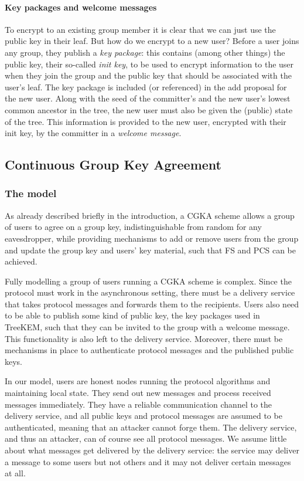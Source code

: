\paragraph{Key packages and welcome messages} To encrypt to an existing group member it is clear that we can just use the public key in their leaf. But how do we encrypt to a new user? Before a user joins any group, they publish a \emph{key package}: this contains (among other things) the public key, their so-called \emph{init key}, to be used to encrypt information to the user when they join the group and the public key that should be associated with the user's leaf. The key package is included (or referenced) in the add proposal for the new user. Along with the seed of the committer's and the new user's lowest common ancestor in the tree, the new user must also be given the (public) state of the tree. This information is provided to the new user, encrypted with their init key, by the committer in a \emph{welcome message}.

\subsection{Continuous Group Key Agreement}

\subsubsection{The model}

As already described briefly in the introduction, a CGKA scheme allows a group of users to agree on a group key, indistinguishable from random for any eavesdropper, while providing mechanisms to add or remove users from the group and update the group key and users' key material, such that FS and PCS can be achieved.

Fully modelling a group of users running a CGKA scheme is complex. Since the protocol must work in the asynchronous setting, there must be a delivery service that takes protocol messages and forwards them to the recipients. Users also need to be able to publish some kind of public key, the key packages used in TreeKEM, such that they can be invited to the group with a welcome message. This functionality is also left to the delivery service. Moreover, there must be mechanisms in place to authenticate protocol messages and the published public keys.

In our model, users are honest nodes running the protocol algorithms and maintaining local state. They send out new messages and process received messages immediately. They have a reliable communication channel to the delivery service, and all public keys and protocol messages are assumed to be authenticated, meaning that an attacker cannot forge them. The delivery service, and thus an attacker, can of course see all protocol messages. We assume little about what messages get delivered by the delivery service: the service may deliver a message to some users but not others and it may not deliver certain messages at all.

